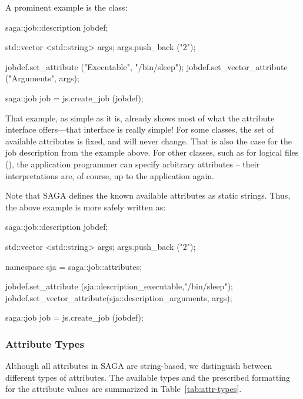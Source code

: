  A prominent example is the 
 class:

 \begin{mycode}
  saga::job::description jobdef;

  std::vector <std::string> args;
  args.push_back ("2");
  
  jobdef.set_attribute        ("Executable", "/bin/sleep");
  jobdef.set_vector_attribute ("Arguments",  args);

 
  saga::job job = js.create_job (jobdef);
 \end{mycode}

 That example, as simple as it is, already shows most of what
 the attribute interface offers---that interface is really simple! 
 For some classes, the set of available attributes is fixed, and
 will never change.  That is also the case for the job
 description from the example above.  For other classes, such as for
 logical files (), the application programmer can
 specify arbitrary attributes -- their interpretations are, of
 course, up to the application again.

 Note that SAGA defines the known available attributes as static
 strings.  Thus, the above example is more safely written as:


 \begin{mycode}
  saga::job::description jobdef;

  std::vector <std::string> args;
  args.push_back ("2");
  
  namespace sja = saga::job::attributes;

  jobdef.set_attribute       (sja::description_executable,"/bin/sleep");
  jobdef.set_vector_attribute(sja::description_arguments, args);
 
  saga::job job = js.create_job (jobdef);
 \end{mycode}
 \subsubsection{Attribute Types}

  Although all attributes in SAGA are string-based, we distinguish
  between different types of attributes.  The available types and the
  prescribed formatting for the attribute values are summarized in
  Table~\ref{tab:attr-types}.  

   \UndefineShortVerb{\|}

